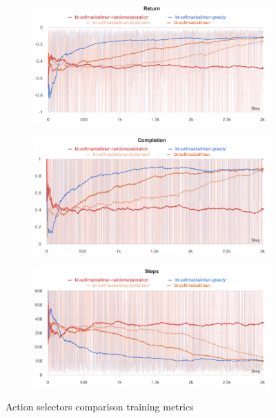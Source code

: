\documentclass[a4paper,10pt]{report}
\begin{document}
\begin{figure}[h]
	\centering
	\captionsetup[subfigure]{justification=centering}
	\begin{subfigure}[b]{\linewidth}
		\includegraphics[width=\textwidth]{action-selectors-returns}
	\end{subfigure}
	
	\begin{subfigure}[b]{\linewidth}
		\includegraphics[width=\textwidth]{action-selectors-completions}
	\end{subfigure}
	
	\begin{subfigure}[b]{\linewidth}
		\includegraphics[width=\textwidth]{action-selectors-steps}
	\end{subfigure}

	\caption{Action selectors comparison training metrics}
	\label{fig:action-selectors-metrics}
\end{figure}
\clearpage
\end{document}
